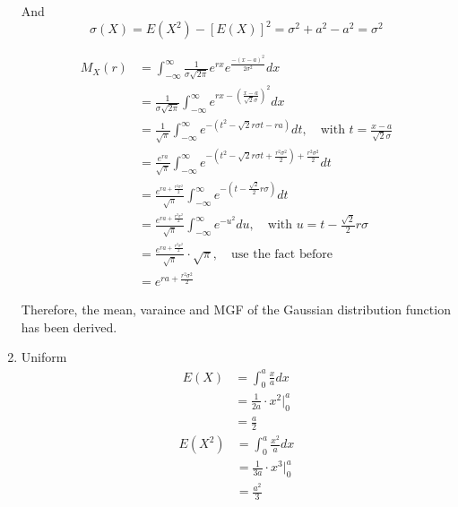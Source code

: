 \documentclass[UTF8]{article}
\begin{document}
\begin{enumerate}
            And
            \begin{equation*}
                \sigma(X)=E(X^2)-[E(X)]^2=\sigma^2+a^2-a^2=\sigma^2
            \end{equation*}

            \begin{equation*}
                \begin{split}
                    M_X(r)&=\int^\infty_{-\infty}\frac{1}{\sigma\sqrt{2\pi}}e^{rx}e^{\frac{-(x-a)^2}{2\sigma^2}}dx\\
                    &=\frac{1}{\sigma\sqrt{2\pi}}\int^\infty_{-\infty}e^{rx-(\frac{x-a}{\sqrt{2}\sigma})^2}dx\\
                    &=\frac{1}{\sqrt{\pi}}\int^{\infty}_{-\infty}e^{-(t^2-\sqrt{2}r\sigma t-ra)}dt,\quad\text{with $t=\frac{x-a}{\sqrt{2}\sigma}$}\\
                    &= \frac{e^{ra}}{\sqrt{\pi}}\int^\infty_{-\infty}e^{-(t^2-\sqrt{2}r\sigma t+\frac{r^2\sigma^2}{2})+\frac{r^2\sigma^2}{2}}dt\\
                    &= \frac{e^{ra+\frac{r^2\sigma^2}{2}}}{\sqrt{\pi}}\int^\infty_{-\infty}e^{-(t-\frac{\sqrt{2}}{2}r\sigma)}dt\\
                    &=\frac{e^{ra+\frac{r^2\sigma^2}{2}}}{\sqrt{\pi}}\int^\infty_{-\infty}e^{-u^2}du,\quad\text{with $u=t-\frac{\sqrt{2}}{2}r\sigma$}\\
                    &= \frac{e^{ra+\frac{r^2\sigma^2}{2}}}{\sqrt{\pi}}\cdot\sqrt{\pi},\quad\text{use the fact before}\\
                    &=e^{ra+\frac{r^2\sigma^2}{2}}
                \end{split}
            \end{equation*}

            Therefore, the mean, varaince and MGF of the Gaussian distribution function has been derived.
            \item Uniform
            \begin{equation*}
                \begin{split}
                    E(X) &= \int^a_0\frac{x}{a}dx\\
                        &= \frac{1}{2a}\cdot x^2\big|^a_0\\
                        &=\frac{a}{2}
                \end{split}
            \end{equation*}
            \begin{equation*}
                \begin{split}
                    E(X^2) &=\int^a_0\frac{x^2}{a}dx\\
                    &=\frac{1}{3a}\cdot x^3\big|^a_0\\
                    &=\frac{a^2}{3}
                \end{split}
            \end{equation*}


\end{enumerate}
\end{document}
